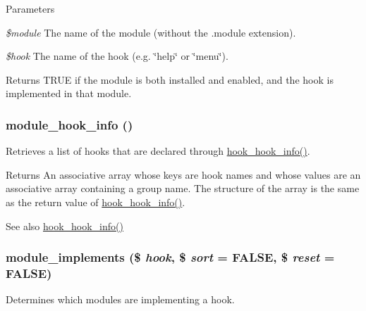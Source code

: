 \begin{DoxyParams}{Parameters}
\item[{\em \$module}]The name of the module (without the .module extension). \item[{\em \$hook}]The name of the hook (e.g. \char`\"{}help\char`\"{} or \char`\"{}menu\char`\"{}).\end{DoxyParams}
\begin{DoxyReturn}{Returns}
TRUE if the module is both installed and enabled, and the hook is implemented in that module. 
\end{DoxyReturn}
\hypertarget{group__hooks_ga30e72b1391cfa4c282fe98e0dabe02f9}{
\subsubsection[{module\_\-hook\_\-info}]{\setlength{\rightskip}{0pt plus 5cm}module\_\-hook\_\-info ()}}
\label{group__hooks_ga30e72b1391cfa4c282fe98e0dabe02f9}
Retrieves a list of hooks that are declared through \hyperlink{group__hooks_ga65142e7864f445483786087d180a2010}{hook\_\-hook\_\-info()}.

\begin{DoxyReturn}{Returns}
An associative array whose keys are hook names and whose values are an associative array containing a group name. The structure of the array is the same as the return value of \hyperlink{group__hooks_ga65142e7864f445483786087d180a2010}{hook\_\-hook\_\-info()}.
\end{DoxyReturn}
\begin{DoxySeeAlso}{See also}
\hyperlink{group__hooks_ga65142e7864f445483786087d180a2010}{hook\_\-hook\_\-info()} 
\end{DoxySeeAlso}
\hypertarget{group__hooks_ga9191200072f2a641829e9d3c2759561f}{
\subsubsection[{module\_\-implements}]{\setlength{\rightskip}{0pt plus 5cm}module\_\-implements (\$ {\em hook}, \/  \$ {\em sort} = {\ttfamily FALSE}, \/  \$ {\em reset} = {\ttfamily FALSE})}}
\label{group__hooks_ga9191200072f2a641829e9d3c2759561f}
Determines which modules are implementing a hook.


